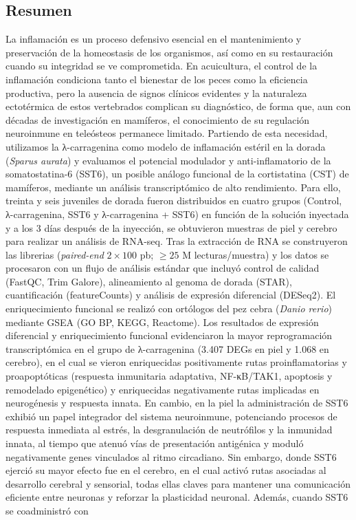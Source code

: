\documentclass[10pt,a4paper]{article}
\begin{document}
\newpage

\begin{center}
\section*{Resumen}
\end{center}

La inflamación es un proceso defensivo esencial en el mantenimiento y preservación de la homeostasis de los organismos, así como en su restauración cuando su integridad se ve comprometida. En acuicultura, el control de la inflamación condiciona tanto el bienestar de los peces como la eficiencia productiva, pero la ausencia de signos clínicos evidentes y la naturaleza ectotérmica de estos vertebrados complican su diagnóstico, de forma que, aun con décadas de investigación en mamíferos, el conocimiento de su regulación neuroinmune en teleósteos permanece limitado. Partiendo de esta necesidad, utilizamos la λ-carragenina como modelo de inflamación estéril en la dorada (\textit{Sparus aurata}) y evaluamos el potencial modulador y anti-inflamatorio de la somatostatina-6 (SST6), un posible análogo funcional de la cortistatina (CST) de mamíferos, mediante un análisis transcriptómico de alto rendimiento. Para ello, treinta y seis juveniles de dorada fueron distribuidos en cuatro grupos (Control, λ-carragenina, SST6 y λ-carragenina + SST6) en función de la solución inyectada y a los 3 días después de la inyección, se obtuvieron muestras de piel y cerebro para realizar un análisis de RNA-seq. Tras la extracción de RNA se construyeron las librerias (\textit{paired-end} $2 \times 100$ pb; $\ge 25$ M lecturas/muestra) y los datos se procesaron con un flujo de análisis estándar que incluyó control de calidad (FastQC, Trim Galore), alineamiento al genoma de dorada (STAR), cuantificación (featureCounts) y análisis de expresión diferencial (DESeq2). El enriquecimiento funcional se realizó con ortólogos del pez cebra (\textit{Danio rerio}) mediante GSEA (GO BP, KEGG, Reactome). Los resultados de expresión diferencial y enriquecimiento funcional evidenciaron la mayor reprogramación transcriptómica en el grupo de λ-carragenina (3.407 DEGs en piel y 1.068 en cerebro), en el cual se vieron enriquecidas positivamente rutas proinflamatorias y proapoptóticas (respuesta inmunitaria adaptativa, NF-κB/TAK1, apoptosis y remodelado epigenético) y enriquecidas negativamente rutas implicadas en neurogénesis y respuesta innata. En cambio, en la piel la administración de SST6 exhibió un papel integrador del sistema neuroinmune, potenciando procesos de respuesta inmediata al estrés, la desgranulación de neutrófilos y la inmunidad innata, al tiempo que atenuó vías de presentación antigénica y moduló negativamente genes vinculados al ritmo circadiano. Sin embargo, donde SST6 ejerció su mayor efecto fue en el cerebro, en el cual activó rutas asociadas al desarrollo cerebral y sensorial, todas ellas claves para mantener una comunicación eficiente entre neuronas y reforzar la plasticidad neuronal. Además, cuando SST6 se coadministró con 
\end{document}
